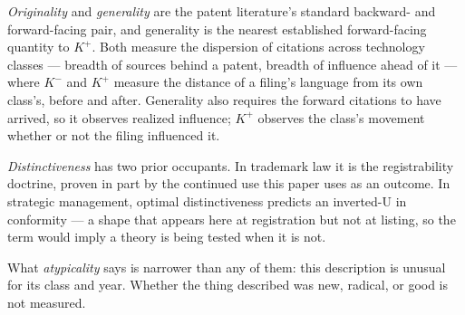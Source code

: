 \emph{Originality} and \emph{generality} \citep{HallJaffe2001} are the
patent literature's standard backward- and forward-facing pair, and
generality is the nearest established forward-facing quantity to $K^+$.
Both measure the dispersion of citations across technology classes ---
breadth of sources behind a patent, breadth of influence ahead of it ---
where $K^-$ and $K^+$ measure the distance of a filing's language from
its own class's, before and after. Generality also requires the forward
citations to have arrived, so it observes realized influence; $K^+$
observes the class's movement whether or not the filing influenced it.

\emph{Distinctiveness} has two prior occupants. In trademark law it is the
registrability doctrine, proven in part by the continued use this paper uses
as an outcome. In strategic management, optimal distinctiveness
\citep{Zhao2017} predicts an inverted-U in conformity --- a shape that
appears here at registration but not at listing, so the term would imply a
theory is being tested when it is not.

What \emph{atypicality} says is narrower than any of them: this description
is unusual for its class and year. Whether the thing described was new,
radical, or good is not measured.


